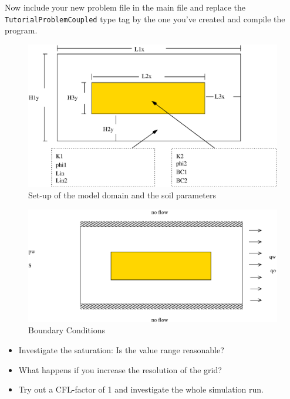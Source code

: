 Now include your new problem file in the main file and replace the
\texttt{TutorialProblemCoupled} type tag by the one you've created and
compile the program.


\begin{figure}[h]
\centering
\includegraphics[width=0.8\linewidth,keepaspectratio]{EPS/Ex2_Domain.eps}
\caption{Set-up of the model domain and the soil parameters}\label{tutorial-decoupled:ex2_Domain}
\end{figure}

\begin{figure}[h]
\centering
\includegraphics[width=0.8\linewidth,keepaspectratio]{EPS/Ex2_Boundary.eps}
\caption{Boundary Conditions}\label{tutorial-decoupled:ex2_BC}
\end{figure}

\begin{itemize}
 \item Investigate the saturation: Is the value range reasonable?
 \item What happens if you increase the resolution of the grid?
 \item Try out a CFL-factor of 1 and investigate the whole simulation run.
\end{itemize}


